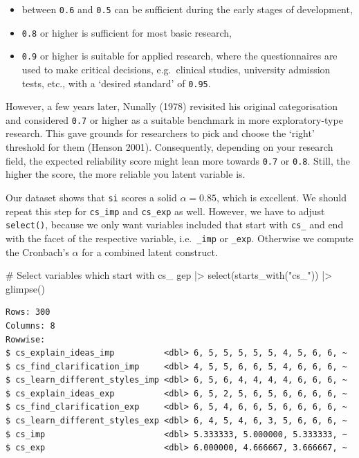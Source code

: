 \documentclass[
  letterpaper,
  DIV=11,
  numbers=noendperiod]{scrreprt}
\newenvironment{Shaded}{\begin{snugshade}}{\end{snugshade}}
\newcommand{\CommentTok}[1]{\textcolor[rgb]{0.37,0.37,0.37}{#1}}
\newcommand{\FunctionTok}[1]{\textcolor[rgb]{0.28,0.35,0.67}{#1}}
\newcommand{\NormalTok}[1]{\textcolor[rgb]{0.00,0.23,0.31}{#1}}
\newcommand{\SpecialCharTok}[1]{\textcolor[rgb]{0.37,0.37,0.37}{#1}}
\newcommand{\StringTok}[1]{\textcolor[rgb]{0.13,0.47,0.30}{#1}}
\begin{document}
\begin{itemize}
\item
  between \texttt{0.6} and \texttt{0.5} can be sufficient during the
  early stages of development,
\item
  \texttt{0.8} or higher is sufficient for most basic research,
\item
  \texttt{0.9} or higher is suitable for applied research, where the
  questionnaires are used to make critical decisions, e.g.~clinical
  studies, university admission tests, etc., with a `desired standard'
  of \texttt{0.95}.
\end{itemize}

However, a few years later, Nunally (1978) revisited his original
categorisation and considered \texttt{0.7} or higher as a suitable
benchmark in more exploratory-type research. This gave grounds for
researchers to pick and choose the `right' threshold for them (Henson
2001). Consequently, depending on your research field, the expected
reliability score might lean more towards \texttt{0.7} or \texttt{0.8}.
Still, the higher the score, the more reliable you latent variable is.

Our dataset shows that \texttt{si} scores a solid \(\alpha = 0.85\),
which is excellent. We should repeat this step for \texttt{cs\_imp} and
\texttt{cs\_exp} as well. However, we have to adjust \texttt{select()},
because we only want variables included that start with \texttt{cs\_}
and end with the facet of the respective variable, i.e.~\texttt{\_imp}
or \texttt{\_exp}. Otherwise we compute the Cronbach's \(\alpha\) for a
combined latent construct.

\begin{Shaded}
\begin{Highlighting}[]
\CommentTok{\# Select variables which start with \textquotesingle{}cs\_\textquotesingle{}}
\NormalTok{gep }\SpecialCharTok{|\textgreater{}}
  \FunctionTok{select}\NormalTok{(}\FunctionTok{starts\_with}\NormalTok{(}\StringTok{"cs\_"}\NormalTok{)) }\SpecialCharTok{|\textgreater{}}
  \FunctionTok{glimpse}\NormalTok{()}
\end{Highlighting}
\end{Shaded}

\begin{verbatim}
Rows: 300
Columns: 8
Rowwise: 
$ cs_explain_ideas_imp          <dbl> 6, 5, 5, 5, 5, 5, 4, 5, 6, 6, ~
$ cs_find_clarification_imp     <dbl> 4, 5, 5, 6, 6, 5, 4, 6, 6, 6, ~
$ cs_learn_different_styles_imp <dbl> 6, 5, 6, 4, 4, 4, 4, 6, 6, 6, ~
$ cs_explain_ideas_exp          <dbl> 6, 5, 2, 5, 6, 5, 6, 6, 6, 6, ~
$ cs_find_clarification_exp     <dbl> 6, 5, 4, 6, 6, 5, 6, 6, 6, 6, ~
$ cs_learn_different_styles_exp <dbl> 6, 4, 5, 4, 6, 3, 5, 6, 6, 6, ~
$ cs_imp                        <dbl> 5.333333, 5.000000, 5.333333, ~
$ cs_exp                        <dbl> 6.000000, 4.666667, 3.666667, ~
\end{verbatim}
\end{document}

